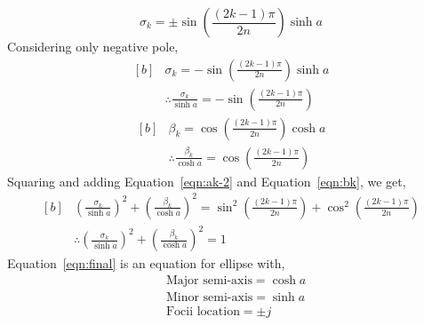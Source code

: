 \begin{equation}
    \sigma_k=\pm\sin\left(\frac{(2k-1)\pi}{2n}\right)\sinh a 
    \label{eqn:ak-1}
\end{equation}
Considering only negative pole,
\begin{equation}
  \begin{aligned}[b]
    &\sigma_k=-\sin\left(\frac{(2k-1)\pi}{2n}\right)\sinh a \\
    &\therefore \frac{\sigma_k}{\sinh a}=-\sin\left(\frac{(2k-1)\pi}{2n}\right)
  \end{aligned}
    \label{eqn:ak-2}
\end{equation}
\begin{equation}
    \begin{aligned}[b]
       & \beta_k=\cos\left(\frac{(2k-1)\pi}{2n}\right)\cosh a \\
       & \therefore \frac{\beta_k}{\cosh a}=\cos\left(\frac{(2k-1)\pi}{2n}\right)
    \end{aligned}
    \label{eqn:bk}
\end{equation}
Squaring and adding Equation~\ref{eqn:ak-2} and Equation~\ref{eqn:bk}, we get,
\begin{equation}
    \begin{aligned}[b]
        &\left(\frac{\sigma_k}{\sinh a}\right)^2+\left(\frac{\beta_k}{\cosh a}\right)^2=\sin^2\left(\frac{(2k-1)\pi}{2n}\right)
        +\cos^2\left(\frac{(2k-1)\pi}{2n}\right)\\
        &\therefore \left(\frac{\sigma_k}{\sinh a}\right)^2+\left(\frac{\beta_k}{\cosh a}\right)^2=1
    \end{aligned}
    \label{eqn:final}
\end{equation}
Equation~\ref{eqn:final} is an equation for ellipse with,
\begin{equation*}
        \begin{aligned}
        &\text{Major semi-axis}=\cosh a\\
        &\text{Minor semi-axis}=\sinh a\\
        &\text{Focii location}=\pm j
        \end{aligned}
\end{equation*}
